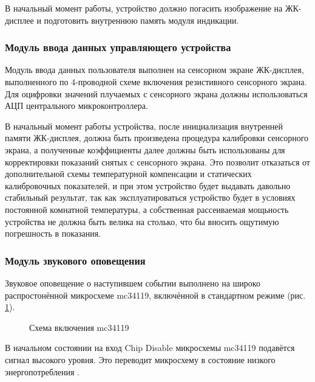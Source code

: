 \begin{par}
В начальный момент работы, устройство должно погасить изображение на ЖК-дисплее и подготовить внутреннюю
память модуля индикации.
\end{par}

\subsubsection{Модуль ввода данных управляющего устройства}
\begin{par}
Модуль ввода данных пользователя выполнен на сенсорном экране ЖК-дисплея,
выполненного по 4-проводной схеме включения резистивного сенсорного экрана. Для
оцифровки значений плучаемых с сенсорного экрана должны использоваться АЦП\cite{avradc} центрального
микроконтроллера.
\end{par}

\begin{par}
В начальный момент работы устройства, после инициализация внутренней памяти ЖК-дисплея, должна быть
произведена процедура калибровки сенсорного экрана, а полученные коэффициенты далее должны быть
использованы для корректировки показаний снятых с сенсорного экрана. Это позволит отказаться
от дополнительной схемы температурной компенсации и статических калибровочных показателей,
и при этом устройство будет выдавать давольно стабильный результат,
так как эксплуатироваться устройство будет в условиях постоянной комнатной температуры,
а собственная рассеиваемая мощьность устройства не должна быть велика на столько, что бы
вносить ощутимую погрешность в показания.
\end{par}

\subsubsection{Модуль звукового оповещения}
\begin{par}
Звуковое оповещение о наступившем событии выполнено на широко распростонённой
микросхеме mc34119, включённой в стандартном режиме (рис. \ref{img:mc34119m}).
\begin{figure}[h]
	\caption{Схема включения mc34119}
	\label{img:mc34119m}
\end{figure}
\end{par}

\begin{par}
В начальном состоянии на вход Chip Disable микросхемы mc34119 подавётся сигнал высокого уровня.
Это переводит микросхему в состояние низкого энергопотребления \cite{mc34119}.
\end{par}

